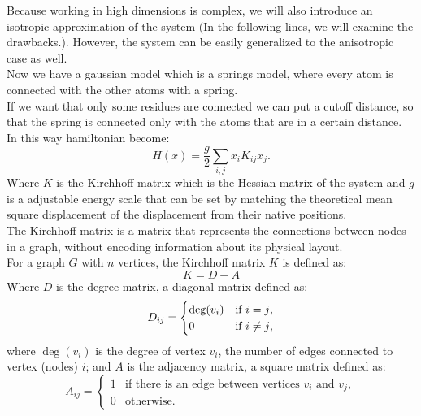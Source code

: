 \documentclass[English, Lau, oneside]{sapthesis}
\begin{document}
Because working in high dimensions is complex, we will also introduce an isotropic approximation of the system (In the following lines, we will examine the drawbacks.). However, the system can be easily generalized to the anisotropic case as well.\\
Now we have a gaussian model which is a springs model, where every atom is connected with the other atoms with a spring.\\
If we want that only some residues are connected we can put a cutoff distance, so that the spring is connected only with the atoms that are in a certain distance.\\
In this way hamiltonian become:
\begin{equation}
    H({x}) = \frac{g}{2} \sum_{i,j} x_i K_{ij} x_j.
\end{equation}
Where \( K \) is the Kirchhoff matrix which is the Hessian matrix of the system and \( g \) is a adjustable energy scale that can be set by matching the theoretical mean square displacement of the displacement from their native positions.\\
The Kirchhoff matrix is a matrix that represents the connections between nodes in a graph, without encoding information about its physical layout.\\
For a graph \( G \) with \( n \) vertices, the Kirchhoff matrix \( K \) is defined as:\cite{ref11}
\begin{equation}
    K = D - A \label{Kirchhoff}
\end{equation}
Where \( D \) is the degree matrix, a diagonal matrix defined as:
\begin{equation}
    D_{ij} = 
    \begin{cases} 
      \deg(v_i) & \text{if \( i = j \),} \\
      0 & \text{if \( i \neq j \),}
    \end{cases}
\end{equation}
where \( \deg(v_i) \) is the degree of vertex \( v_i \), the number of edges connected to vertex (nodes) \( i \); and \( A \) is the adjacency matrix, a square matrix defined as:
\begin{equation}
    A_{ij} = 
    \begin{cases} 
      1 & \text{if there is an edge between vertices } v_i \text{ and } v_j, \\
      0 & \text{otherwise}.
    \end{cases}
\end{equation}
\end{document}
